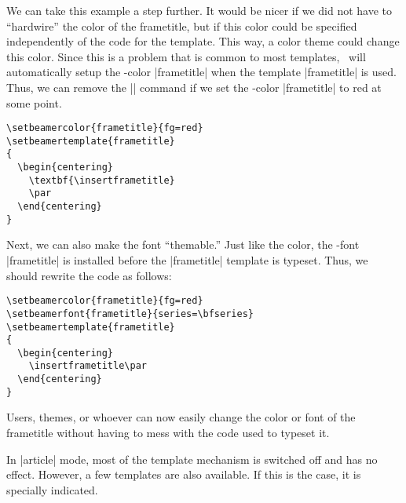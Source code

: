 We can take this example a step further. It would be nicer if we did not have to ``hardwire'' the color of the frametitle, but if this color could be specified independently of the code for the template. This way, a color theme could change this color. Since this is a problem that is common to most templates, \beamer\ will automatically setup the \beamer-color |frametitle| when the template |frametitle| is used. Thus, we can remove the |\color{red}| command if we set the \beamer-color |frametitle| to red at some point.
\begin{verbatim}
\setbeamercolor{frametitle}{fg=red}
\setbeamertemplate{frametitle}
{
  \begin{centering}
    \textbf{\insertframetitle}
    \par
  \end{centering}
}
\end{verbatim}
Next, we can also make the font ``themable.'' Just like the color, the \beamer-font |frametitle| is installed before the |frametitle| template is typeset. Thus, we should rewrite the code as follows:
\begin{verbatim}
\setbeamercolor{frametitle}{fg=red}
\setbeamerfont{frametitle}{series=\bfseries}
\setbeamertemplate{frametitle}
{
  \begin{centering}
    \insertframetitle\par
  \end{centering}
}
\end{verbatim}
Users, themes, or whoever can now easily change the color or font of the frametitle without having to mess with the code used to typeset it.

\articlenote
In |article| mode, most of the template mechanism is switched off and has no effect. However, a few templates are also available. If this is the case, it is specially indicated.
\smallskip


